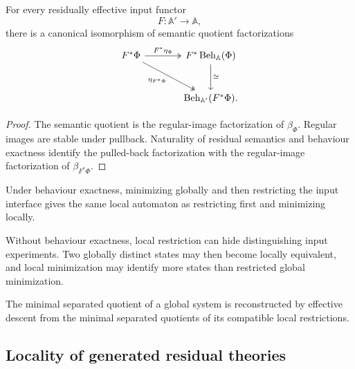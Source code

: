 \begin{theorem}
\label{thm:semantic-minimization-local-restriction}
For every residually effective input functor
\[
    F:\mathbb A'\to\mathbb A,
\]
there is a canonical isomorphism of semantic quotient factorizations
\[
\begin{tikzcd}[column sep=large,row sep=large]
    F^\ast\Phi
        \arrow[r, two heads, "F^\ast\eta_\Phi"]
        \arrow[dr, two heads, "\eta_{F^\ast\Phi}"']
    &
    F^\ast
    \operatorname{Beh}_{\mathbb A}(\Phi)
        \arrow[d, "\cong"]
    \\
    {}
    &
    \operatorname{Beh}_{\mathbb A'}
    (F^\ast\Phi).
\end{tikzcd}
\]
\end{theorem}

\begin{proof}
The semantic quotient is the regular-image factorization of
\(\beta_\Phi\). Regular images are stable under pullback. Naturality of
residual semantics and behaviour exactness identify the pulled-back
factorization with the regular-image factorization of
\(\beta_{F^\ast\Phi}\).
\end{proof}

\begin{remark}
\label{rem:local-minimization-interpretation}
Under behaviour exactness, minimizing globally and then restricting the input
interface gives the same local automaton as restricting first and minimizing
locally.

Without behaviour exactness, local restriction can hide distinguishing input
experiments. Two globally distinct states may then become locally equivalent,
and local minimization may identify more states than restricted global
minimization.
\end{remark}

\begin{corollary}
\label{cor:local-reconstruction-minimal-separated-quotients}
The minimal separated quotient of a global system is reconstructed by
effective descent from the minimal separated quotients of its compatible local
restrictions.
\end{corollary}

\subsection{Locality of generated residual theories}
\label{subsec:locality-generated-residual-theories}

